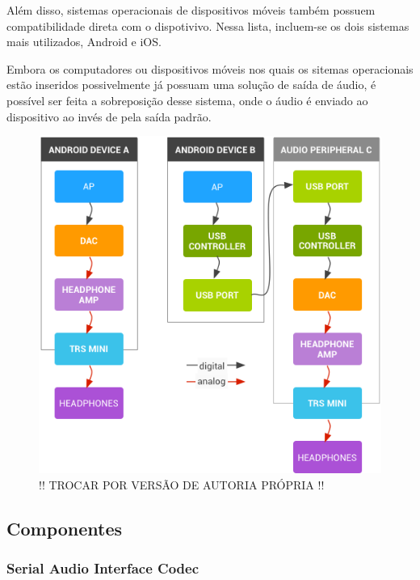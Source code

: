 Além disso, sistemas operacionais de dispositivos móveis também possuem compatibilidade direta com o dispotivivo. Nessa lista, incluem-se os dois sistemas mais utilizados, Android e iOS.

Embora os computadores ou dispositivos móveis nos quais os sitemas operacionais estão inseridos possivelmente já possuam uma solução de saída de áudio, é possível ser feita a sobreposição desse sistema, onde o áudio é enviado ao dispositivo ao invés de pela saída padrão.

\begin{figure}[!h]
  \includegraphics[scale=0.5]{figuras/usb-android-dscs.png}
  \caption{!! TROCAR POR VERSÃO DE AUTORIA PRÓPRIA !!}
  \label{fig:synchronousMode}
\end{figure}


\subsection{Componentes}

\subsubsection{Serial Audio Interface Codec}

